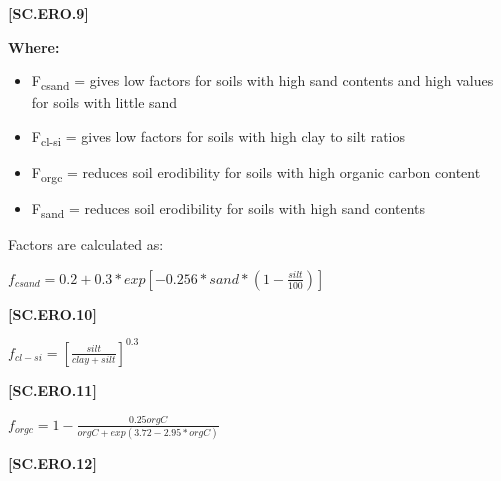             {\raggedleft \textbf{[SC.ERO.9]}\par}
            \vspace{0.2cm}

        \textbf{Where:}
            
        \begin{itemize}
            \item F\textsubscript{csand}	=	gives low factors for soils with high sand contents and high values for soils with little sand
            \item F\textsubscript{cl-si}	=	gives low factors for soils with high clay to silt ratios
            \item F\textsubscript{orgc}	=	reduces soil erodibility for soils with high organic carbon content
            \item F\textsubscript{sand}	=	reduces soil erodibility for soils with high sand contents
        \end{itemize}
    \vspace{0.5cm}

Factors are calculated as: 
    \vspace{0.5cm}

    \begin{center}
 \(f_{csand}=0.2+0.3*exp[-0.256 * sand * (1-\frac{silt}{100})]	\)
    \end{center}
        \vspace{0.5cm} 
    
            {\raggedleft \textbf{[SC.ERO.10]}\par}
            \vspace{0.5cm}

    \begin{center}
 \(f_{cl-si}=[\frac{silt}{clay+silt}]^{0.3}		\)
    \end{center}
        \vspace{0.5cm} 
    
            {\raggedleft \textbf{[SC.ERO.11]}\par}
            \vspace{0.5cm}

    \begin{center}
 \(f_{orgc}=1 - \frac{0.25orgC}{orgC + exp(3.72-2.95 * orgC)}\)
    \end{center}
        \vspace{0.5cm} 
    
            {\raggedleft \textbf{[SC.ERO.12]}\par}
            \vspace{0.5cm}

